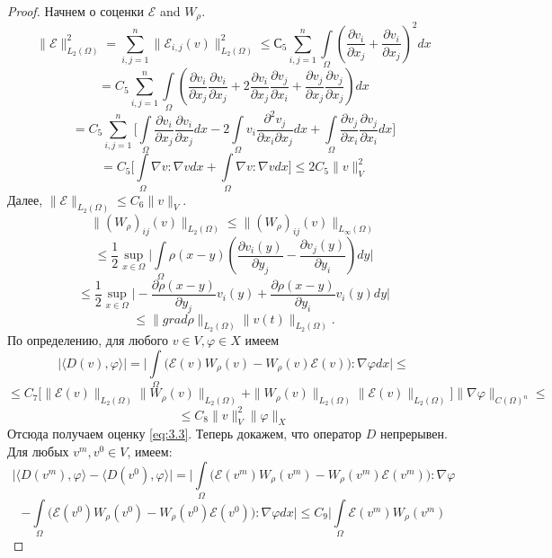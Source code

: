 \begin{proof}
    Начнем о соценки $\mathcal{E}$ and $W_{\rho}$.
    $$\parallel\mathcal{E}\parallel^2_{L_2(\Omega)}=\sum_{i,j=1}^n \parallel\mathcal{E}_{i,j}(v)\parallel^2_{L_2(\Omega)}
    \leqslant С_5 \sum_{i,j=1}^n\int\limits_{\Omega}(\frac{\partial v_i}{\partial x_j}+\frac{\partial v_i}{\partial x_j})^2 dx$$
    $$=C_5\sum_{i,j=1}^n\int\limits_{\Omega}(\frac{\partial v_i}{\partial x_j}\frac{\partial v_i}{\partial x_j}+
    2\frac{\partial v_i}{\partial x_j}\frac{\partial v_j}{\partial x_i}+\frac{\partial v_j}{\partial x_j}\frac{\partial v_j}{\partial x_j})dx$$
    $$=C_5\sum_{i,j=1}^n\bigg[\int\limits_{\Omega}\frac{\partial v_i}{\partial x_j}\frac{\partial v_i}{\partial x_j}dx-
    2\int\limits_{\Omega} v_i\frac{\partial^2 v_j}{\partial x_i\partial x_j}dx+\int\limits_{\Omega}\frac{\partial v_j}{\partial x_i}\frac{\partial v_j}{\partial x_i}dx\bigg]$$
    $$=C_5\bigg[\int\limits_{\Omega}\nabla v : \nabla v dx +\int\limits_{\Omega}\nabla v : \nabla v dx\bigg]\leqslant
    2C_5\parallel v\parallel^2_V$$
    Далее, $\parallel\mathcal{E}\parallel_{L_2(\Omega)}\leqslant C_6\parallel v\parallel_V$.
    $$\parallel(W_{\rho})_{ij}(v)\parallel_{L_2(\Omega)}\leqslant\parallel(W_{\rho})_{ij}(v)\parallel_{L_{\infty}(\Omega)}$$
    $$\leqslant \frac{1}{2} \sup_{x\in\Omega}\bigg|\int\limits_{\Omega}\rho (x-y)(\frac{\partial v_i(y)}{\partial y_j}-\frac{\partial v_j(y)}{\partial y_i})dy\bigg|$$
    $$\leqslant \frac{1}{2}\sup\limits_{x\in\Omega} \bigg|-\frac{\partial\rho (x-y)}{\partial y_j}v_i(y)+\frac{\partial\rho (x-y)}{\partial y_i}v_i(y)dy\bigg|$$
    $$\leqslant\parallel grad\rho\parallel_{L_2(\Omega)}\parallel v(t)\parallel_{L_2(\Omega)}.$$
    По определению, для любого $v\in V, \varphi\in X$ имеем
    $$\mid\langle D(v),\varphi\rangle\mid=\bigg|\int\limits_{\Omega}\bigg(\mathcal{E}(v)W_{\rho}(v)-W_{\rho}(v)\mathcal{E}(v)\bigg):\nabla\varphi dx\bigg|\leqslant$$
    $$\leqslant C_7\bigg[\|\mathcal{E}(v)\|_{L_2(\Omega)}\|W_{\rho}(v)\|_{L_2(\Omega)}+\|W_{\rho}(v)\|_{L_2(\Omega)}\|\mathcal{E}(v)\|_{L_2(\Omega)}\bigg]\|\nabla\varphi\|_{C(\Omega)^n}\leqslant$$
    $$\leqslant C_8\| v\|^2_V\|\varphi\|_X$$
    Отсюда получаем оценку \ref{eq:3.3}.
    Теперь докажем, что оператор $D$ непрерывен. Для любых $v^m,v^0\in V$, имеем:
    $$\bigg|\langle D(v^m),\varphi\rangle-\langle D(v^0),\varphi\rangle\bigg|=\bigg|\int\limits_{\Omega}\bigg(\mathcal{E}(v^m)W_{\rho}(v^m)-W_{\rho}(v^m)\mathcal{E}(v^m)\bigg):\nabla\varphi$$
    $$-\int\limits_{\Omega}\bigg(\mathcal{E}(v^0)W_{\rho}(v^0)-W_{\rho}(v^0)\mathcal{E}(v^0)\bigg):\nabla\varphi dx\bigg|\leqslant C_9\bigg|\int\limits_{\Omega}\mathcal{E}(v^m)W_{\rho}(v^m)$$

\end{proof}

